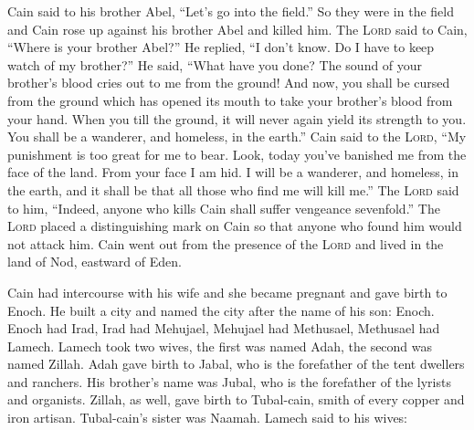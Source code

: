 \begin{inparaenum}
     Cain said to his brother Abel, ``Let's go into the field.'' So they were in the field and Cain rose up against his brother Abel and killed him.%
     The \textsc{Lord} said to Cain, ``Where is your brother Abel?'' He replied, ``I don't know. Do I have to keep watch of my brother?''%
     He said, ``What have you done? The sound of your brother's blood cries out to me from the ground!%
     And now, you shall be cursed from the ground which has opened its mouth to take your brother's blood from your hand.%
     When you till the ground, it will never again yield its strength to you. You shall be a wanderer, and homeless, in the earth.''%
     Cain said to the \textsc{Lord}, ``My punishment is too great for me to bear.%
     Look, today you've banished me from the face of the land. From your face I am hid. I will be a wanderer, and homeless, in the earth, and it shall be that all those who find me will kill me.''%
     The \textsc{Lord} said to him, ``Indeed, anyone who kills Cain shall suffer vengeance sevenfold.'' The \textsc{Lord} placed a distinguishing mark on Cain so that anyone who found him would not attack him.%
     Cain went out from the presence of the \textsc{Lord} and lived in the land of Nod, eastward of Eden.%
    
     Cain had intercourse with his wife and she became pregnant and gave birth to Enoch. He built a city and named the city after the name of his son: Enoch.%
     Enoch had Irad, Irad had Mehujael, Mehujael had Methusael, Methusael had Lamech.%
     Lamech took two wives, the first was named Adah, the second was named Zillah.%
     Adah gave birth to Jabal, who is the forefather of the tent dwellers and ranchers.%
     His brother's name was Jubal, who is the forefather of the lyrists and organists.%
     Zillah, as well, gave birth to Tubal-cain, smith of every copper and iron artisan. Tubal-cain's sister was Naamah.%
     Lamech said to his wives:\smallskip%
    

\end{inparaenum}
